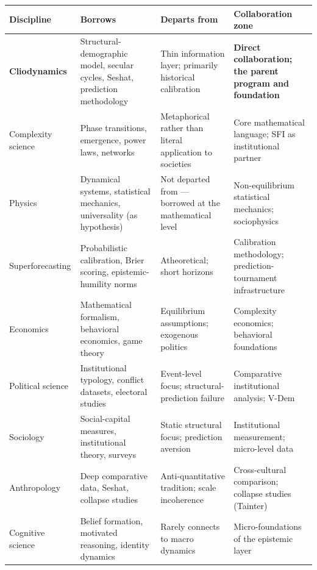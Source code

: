 \documentclass[
]{article}
\newcounter{none} %
\begin{document}
{\def\LTcaptype{none} %
\begin{longtable}[]{@{}
  >{\raggedright\arraybackslash}p{}
  >{\raggedright\arraybackslash}p{}
  >{\raggedright\arraybackslash}p{}
  >{\raggedright\arraybackslash}p{}@{}}
\toprule\noalign{}
\begin{minipage}[b]{\linewidth}\raggedright
Discipline
\end{minipage} & \begin{minipage}[b]{\linewidth}\raggedright
Borrows
\end{minipage} & \begin{minipage}[b]{\linewidth}\raggedright
Departs from
\end{minipage} & \begin{minipage}[b]{\linewidth}\raggedright
Collaboration zone
\end{minipage} \\
\midrule\noalign{}
\endhead
\bottomrule\noalign{}
\endlastfoot
\textbf{Cliodynamics} & Structural-demographic model, secular cycles,
Seshat, prediction methodology & Thin information layer; primarily
historical calibration & \textbf{Direct collaboration; the parent
program and foundation} \\
Complexity science & Phase transitions, emergence, power laws, networks
& Metaphorical rather than literal application to societies & Core
mathematical language; SFI as institutional partner \\
Physics & Dynamical systems, statistical mechanics, universality (as
hypothesis) & Not departed from --- borrowed at the mathematical level &
Non-equilibrium statistical mechanics; sociophysics \\
Superforecasting & Probabilistic calibration, Brier scoring,
epistemic-humility norms & Atheoretical; short horizons & Calibration
methodology; prediction-tournament infrastructure \\
Economics & Mathematical formalism, behavioral economics, game theory &
Equilibrium assumptions; exogenous politics & Complexity economics;
behavioral foundations \\
Political science & Institutional typology, conflict datasets, electoral
studies & Event-level focus; structural-prediction failure & Comparative
institutional analysis; V-Dem \\
Sociology & Social-capital measures, institutional theory, surveys &
Static structural focus; prediction aversion & Institutional
measurement; micro-level data \\
Anthropology & Deep comparative data, Seshat, collapse studies &
Anti-quantitative tradition; scale incoherence & Cross-cultural
comparison; collapse studies (Tainter) \\
Cognitive science & Belief formation, motivated reasoning, identity
dynamics & Rarely connects to macro dynamics & Micro-foundations of the
epistemic layer \\
\end{longtable}
}
\end{document}
